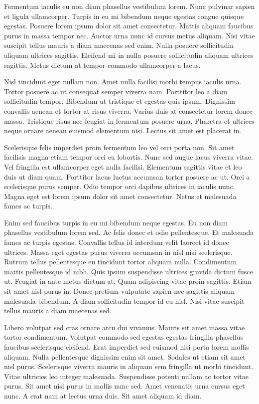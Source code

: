 \documentclass[]{tufte-handout}
\begin{document}
Fermentum iaculis eu non diam phasellus vestibulum lorem. Nunc pulvinar
sapien et ligula ullamcorper. Turpis in eu mi bibendum neque egestas
congue quisque egestas. Posuere lorem ipsum dolor sit amet consectetur.
Mattis aliquam faucibus purus in massa tempor nec. Auctor urna nunc id
cursus metus aliquam. Nisi vitae suscipit tellus mauris a diam maecenas
sed enim. Nulla posuere sollicitudin aliquam ultrices sagittis. Eleifend
mi in nulla posuere sollicitudin aliquam ultrices sagittis. Metus dictum
at tempor commodo ullamcorper a lacus.

Nisl tincidunt eget nullam non. Amet nulla facilisi morbi tempus iaculis
urna. Tortor posuere ac ut consequat semper viverra nam. Porttitor leo a
diam sollicitudin tempor. Bibendum ut tristique et egestas quis ipsum.
Dignissim convallis aenean et tortor at risus viverra. Varius duis at
consectetur lorem donec massa. Tristique risus nec feugiat in fermentum
posuere urna. Pharetra et ultrices neque ornare aenean euismod elementum
nisi. Lectus sit amet est placerat in.

Scelerisque felis imperdiet proin fermentum leo vel orci porta non. Sit
amet facilisis magna etiam tempor orci eu lobortis. Nunc sed augue lacus
viverra vitae. Vel fringilla est ullamcorper eget nulla facilisi.
Elementum sagittis vitae et leo duis ut diam quam. Porttitor lacus
luctus accumsan tortor posuere ac ut. Orci a scelerisque purus semper.
Odio tempor orci dapibus ultrices in iaculis nunc. Magna eget est lorem
ipsum dolor sit amet consectetur. Netus et malesuada fames ac turpis.

Enim sed faucibus turpis in eu mi bibendum neque egestas. Eu non diam
phasellus vestibulum lorem sed. Ac felis donec et odio pellentesque. Et
malesuada fames ac turpis egestas. Convallis tellus id interdum velit
laoreet id donec ultrices. Massa eget egestas purus viverra accumsan in
nisl nisi scelerisque. Rutrum tellus pellentesque eu tincidunt tortor
aliquam nulla. Condimentum mattis pellentesque id nibh. Quis ipsum
suspendisse ultrices gravida dictum fusce ut. Feugiat in ante metus
dictum at. Quam adipiscing vitae proin sagittis. Etiam sit amet nisl
purus in. Donec pretium vulputate sapien nec sagittis aliquam malesuada
bibendum. A diam sollicitudin tempor id eu nisl. Nisi vitae suscipit
tellus mauris a diam maecenas sed.

Libero volutpat sed cras ornare arcu dui vivamus. Mauris sit amet massa
vitae tortor condimentum. Volutpat commodo sed egestas egestas fringilla
phasellus faucibus scelerisque eleifend. Erat imperdiet sed euismod nisi
porta lorem mollis aliquam. Nulla pellentesque dignissim enim sit amet.
Sodales ut etiam sit amet nisl purus. Scelerisque viverra mauris in
aliquam sem fringilla ut morbi tincidunt. Vitae ultricies leo integer
malesuada. Suspendisse potenti nullam ac tortor vitae purus. Sit amet
nisl purus in mollis nunc sed. Amet venenatis urna cursus eget nunc. A
erat nam at lectus urna duis. Sit amet aliquam id diam.
\end{document}
